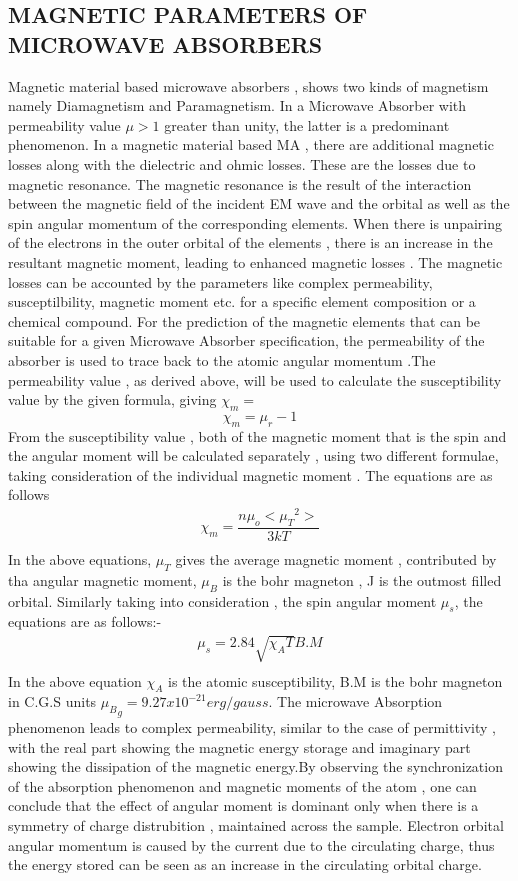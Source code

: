 \documentclass[journal]{IEEEtran}
\begin{document}
\begin{multicols}{2}
\section{MAGNETIC PARAMETERS OF MICROWAVE ABSORBERS}
Magnetic material based microwave absorbers , shows two kinds of magnetism namely Diamagnetism and Paramagnetism. In a Microwave Absorber with permeability value $\mu > 1$ greater than unity, the latter is a predominant phenomenon.
In a magnetic material based MA , there are additional magnetic losses along with the dielectric and ohmic losses. These are the losses due to magnetic resonance. The magnetic resonance is the result of the interaction between the magnetic field of the incident EM wave and the orbital as well as the spin angular momentum of the corresponding elements. When there is unpairing of the electrons in the outer orbital of the elements , there is an increase in the resultant magnetic moment, leading to enhanced magnetic losses\cite{HexaF} \cite{LaMn}. The magnetic losses can be accounted by the parameters like complex  permeability, susceptilbility, magnetic moment etc. for a specific element composition or a chemical compound.
For the prediction of the magnetic elements that can be suitable for a given Microwave Absorber specification, the permeability of the absorber is used to trace back to the atomic angular momentum \cite{Ferrite}.The permeability value , as derived above, will be used to calculate the susceptibility value by the given formula, giving $\chi_m = $
$$ \chi_m = \mu_r -1  $$
From  the susceptibility value , both of  the magnetic moment that is the spin and the angular moment will be calculated separately ,  using two different formulae, taking consideration of the individual magnetic moment \cite{langer2007modern}. The equations are as follows
\begin{align}
\chi_m = \dfrac{n \mu_o {<{\mu_T}^2>}}{3kT} \\
\end{align}
In the above equations, ${\mu_T}$ gives the average magnetic moment , contributed by tha angular magnetic moment, ${\mu_B}$  is the bohr magneton , J is the outmost filled orbital. Similarly taking into consideration , the spin angular moment $\mu_s$, the equations are as follows:-
\begin{align}
\mu_s = 2.84 \sqrt{\chi_A T} B.M \\
\end{align}
In the above equation $\chi_A$ is the atomic susceptibility, B.M  is the bohr magneton in C.G.S units ${\mu_B}_g = 9.27 x 10^{-21} erg/gauss$. The microwave Absorption phenomenon leads to complex permeability, similar to the case of permittivity , with the real part  showing the magnetic energy storage and imaginary part showing the dissipation of the magnetic energy.By observing the  synchronization of the absorption phenomenon and magnetic moments of the atom , one can conclude that the effect of angular moment is dominant only when there is a symmetry of charge distrubition , maintained across the sample. Electron orbital angular momentum is caused by the current due to the circulating charge, thus the energy stored can be seen as an increase in the circulating orbital charge.

\end{multicols}
\end{document}
